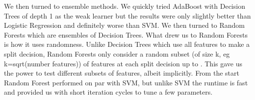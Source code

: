 \documentclass[twoside,11pt]{homework}
\begin{document}
We then turned to ensemble methods. We quickly tried AdaBoost with Decision 
Trees of depth 1 as the weak learner but the results were only slightly better than 
Logistic Regression and definitely worse than SVM. We then turned to Random 
Forests which are ensembles of Decision Trees. What drew us to Random Forests is 
how it uses randomness. Unlike Decision Trees which use all features to make a split 
decision, Random Forests only consider a random subset (of size k, eg 
k=sqrt(number features)) of features at each split decision up to . This gave us the 
power to test different subsets of features, albeit implicitly. From the start Random 
Forest performed on par with SVM, but unlike SVM the runtime is fast and provided 
us with short iteration cycles to tune a few parameters.
\end{document}

